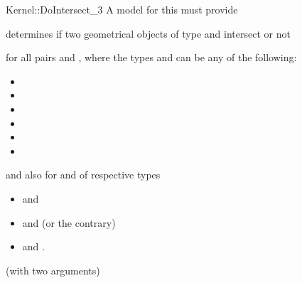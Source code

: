 \begin{ccRefFunctionObjectConcept}{Kernel::DoIntersect_3}
A model for this must provide


{determines if two geometrical objects of type 
 and  intersect or not}

for all pairs  and , where
the types  and 
 can be any of the following:
\begin{itemize}
\item {}
\item {}
\item {}
\item {}
\item {}
\item {}
\end{itemize}
and also for  and  of respective types
\begin{itemize}
\item {} and 
\item {} and  (or the contrary)
\item {} and .
\end{itemize}

\ccRefines
{} (with two arguments)

\ccSeeAlso
{}\\

\end{ccRefFunctionObjectConcept}
